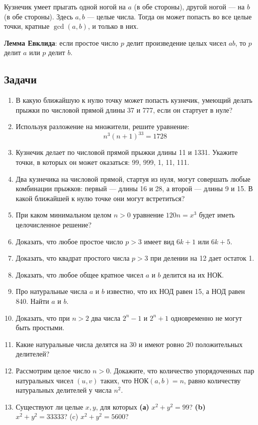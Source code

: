 Кузнечик умеет прыгать одной ногой на $a$ (в обе стороны), другой ногой --- на $b$ (в обе стороны). Здесь $a,b$ --- целые числа. Тогда он может попасть во все целые точки, кратные $\gcd(a,b)$, и только в них.

\textbf{Лемма Евклида}: если простое число $p$ делит произведение целых чисел $ab$, то $p$ делит $a$ или $p$ делит $b$.

\subsection*{Задачи}

\begin{enumerate}
\item В какую ближайшую к нулю точку может попасть кузнечик, умеющий делать прыжки по числовой прямой длины 37 и 777, если он стартует в нуле?
\item Используя разложение на множители, решите уравнение:
$$
n^3 (n + 1)^33 = 1728
$$
\item Кузнечик делает по числовой прямой прыжки длины 11 и 1331. Укажите точки, в которых он может оказаться: 99, 999, 1, 11, 111.
\item Два кузнечика на числовой прямой, стартуя из нуля, могут совершать любые комбинации прыжков: первый --- длины 16 и 28, а второй --- длины 9 и 15. В какой ближайшей к нулю точке они могут встретиться?
\item При каком минимальном целом $n > 0$ уравнение $120n = x^3$ будет иметь целочисленное решение?
\item Доказать, что любое простое число $p>3$ имеет вид $6k+1$ или $6k+5$.
\item Доказать, что квадрат простого числа $p>3$ при делении на 12 дает остаток 1.
\item Доказать, что любое общее кратное чисел $a$ и $b$ делится на их НОК.
\item Про натуральные числа $a$ и $b$ известно, что их НОД равен 15, а НОД равен 840. Найти $a$ и $b$.
\item Доказать, что при $n>2$ два числа $2^n-1$ и $2^n+1$ одновременно не могут быть простыми.

\item Какие натуральные числа делятся на 30 и имеют ровно 20 положительных делителей?
\item Рассмотрим целое число $n>0$. Докажите, что количество упорядоченных пар натуральных чисел $(u,v)$ таких, что НОК$(a,b)=n$, равно количеству натуральных делителей у числа $n^2$.
\item Существуют ли целые $x, y$, для которых \textbf{(а)} $x^2 + y^2 = 99$? \textbf{(b)}
$x^2 + y^2 = 33333$? (c) $x^2 + y^2 = 5600$?


\end{enumerate}

